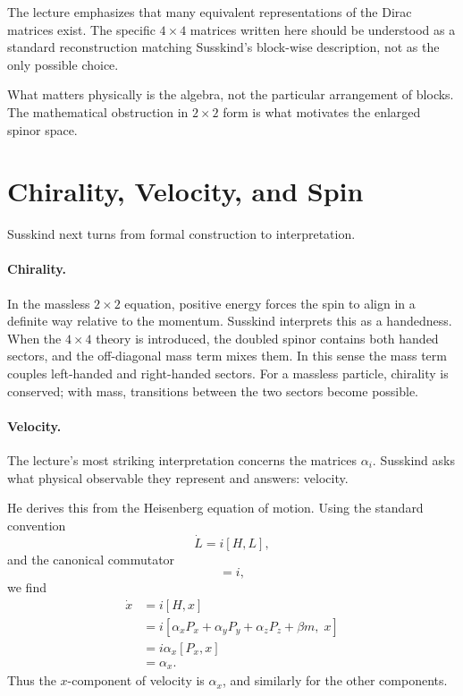 \begin{remark}
The lecture emphasizes that many equivalent representations of the Dirac matrices exist. The specific \(4\times4\) matrices written here should be understood as a standard reconstruction matching Susskind's block-wise description, not as the only possible choice.
\end{remark}

What matters physically is the algebra, not the particular arrangement of blocks. The mathematical obstruction in \(2\times2\) form is what motivates the enlarged spinor space.

\section{Chirality, Velocity, and Spin}

Susskind next turns from formal construction to interpretation.

\paragraph{Chirality.}
In the massless \(2\times2\) equation, positive energy forces the spin to align in a definite way relative to the momentum. Susskind interprets this as a handedness. When the \(4\times4\) theory is introduced, the doubled spinor contains both handed sectors, and the off-diagonal mass term mixes them. In this sense the mass term couples left-handed and right-handed sectors. For a massless particle, chirality is conserved; with mass, transitions between the two sectors become possible.

\paragraph{Velocity.}
The lecture's most striking interpretation concerns the matrices \(\alpha_i\). Susskind asks what physical observable they represent and answers: velocity.

He derives this from the Heisenberg equation of motion. Using the standard convention
\begin{equation}
\dot L=i[H,L],
\end{equation}
and the canonical commutator
\begin{equation}
[x,P_x]=i,
\end{equation}
we find
\begin{align}
\dot x
&=i[H,x] \\
&=i[\alpha_xP_x+\alpha_yP_y+\alpha_zP_z+\beta m,\;x] \\
&=i\alpha_x[P_x,x] \\
&=\alpha_x.
\end{align}
Thus the \(x\)-component of velocity is \(\alpha_x\), and similarly for the other components.

